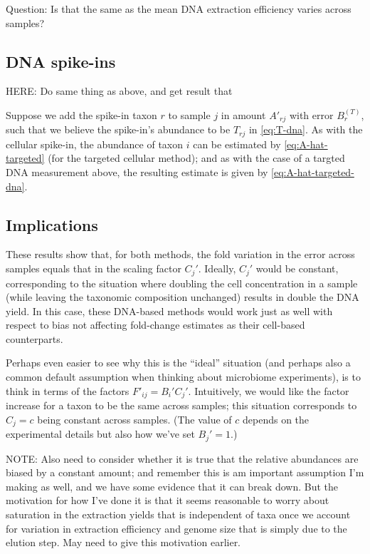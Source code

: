 \documentclass[
]{article}
\theoremstyle{definition}
\theoremstyle{definition}
\theoremstyle{definition}
\theoremstyle{definition}
\theoremstyle{remark}
\begin{document}
Question: Is that the same as the mean DNA extraction efficiency varies across samples?

\hypertarget{dna-spike-ins-1}{%
\subsection{DNA spike-ins}\label{dna-spike-ins-1}}

HERE: Do same thing as above, and get result that

Suppose we add the spike-in taxon \(r\) to sample \(j\) in amount \(A'_{rj}\) with error
\(B^{(T)}_r\), such that we believe the spike-in's abundance to be \(T_{rj}\) in \eqref{eq:T-dna}.
As with the cellular spike-in, the abundance of taxon \(i\) can be estimated by \eqref{eq:A-hat-targeted} (for the targeted cellular method);
and as with the case of a targted DNA measurement above, the resulting estimate is given by \eqref{eq:A-hat-targeted-dna}.

\hypertarget{implications-1}{%
\subsection{Implications}\label{implications-1}}

These results show that, for both methods, the fold variation in the error across samples equals that in the scaling factor \(C_j'\).
Ideally, \(C_j'\) would be constant, corresponding to the situation where doubling the cell concentration in a sample (while leaving the taxonomic composition unchanged) results in double the DNA yield.
In this case, these DNA-based methods would work just as well with respect to bias not affecting fold-change estimates as their cell-based counterparts.

Perhaps even easier to see why this is the ``ideal'' situation (and perhaps also a common default assumption when thinking about microbiome experiments), is to think in terms of the factors \(F'_{ij} = B_i' C_j'\).
Intuitively, we would like the factor increase for a taxon to be the same across samples; this situation corresponds to \(C_j = c\) being constant across samples.
(The value of \(c\) depends on the experimental details but also how we've set \(B_j' = 1\).)

NOTE: Also need to consider whether it is true that the relative abundances are biased by a constant amount; and remember this is am important assumption I'm making as well, and we have some evidence that it can break down.
But the motivation for how I've done it is that it seems reasonable to worry about saturation in the extraction yields that is independent of taxa once we account for variation in extraction efficiency and genome size that is simply due to the elution step.
May need to give this motivation earlier.
\end{document}
